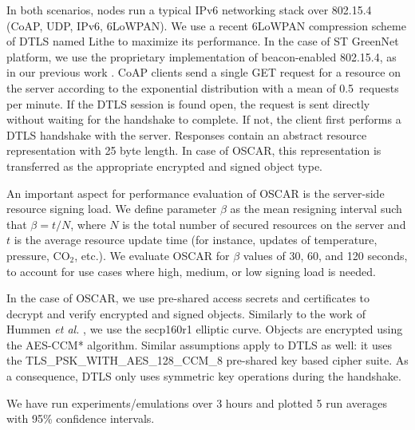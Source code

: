 \documentclass[conference]{IEEEtran}
\begin{document}
In both scenarios, nodes run a typical IPv6 networking stack over 802.15.4
(CoAP, UDP, IPv6, 6LoWPAN). We use a recent 6LoWPAN compression scheme of DTLS
named Lithe \cite{lithe} to maximize its performance. In the case of ST GreenNet platform,
we use the proprietary implementation of beacon-enabled 802.15.4, as in our previous work
 \cite{l2energycost, rpl-topologyconstruction}. CoAP clients send a single
GET request for a resource on the server according to the exponential
distribution with a mean of 0.5~requests per minute. If the DTLS session is
found open, the request is sent directly without waiting for the handshake to
complete. If not, the client first performs a DTLS handshake with the server. Responses contain an abstract resource representation with 25 byte length. In case of OSCAR, this representation is transferred as the appropriate encrypted and signed object type.



An important aspect for performance evaluation of OSCAR is the server-side
resource signing load. We define parameter $\beta$ as the mean resigning
interval such that $\beta=t/N$, where $N$ is the total number of secured
resources on the server and $t$ is the average resource update time (for
instance, updates of temperature, pressure, CO$_2$, etc.). We evaluate OSCAR for
$\beta$ values of 30, 60, and 120 seconds, to account for use cases where high, medium, or low signing load is needed. 

In the case of OSCAR, we use pre-shared access secrets and certificates to
decrypt and verify encrypted and signed objects. Similarly to the work of Hummen
\emph{et al.} \cite{hummen-certificate}, we use the secp160r1 elliptic
curve. Objects are encrypted using the AES-CCM* algorithm. Similar assumptions
apply to DTLS as well: it uses the TLS\_PSK\_WITH\_AES\_128\_CCM\_8 pre-shared key based cipher suite. As a consequence, DTLS only uses symmetric key operations during the handshake.

We have run experiments/emulations over 3 hours and plotted 5 run averages with 95\% confidence intervals.


\begin{table}[htbp]
\caption{Experiment setup.\label{tab:params}
}
\centering
{}
\label{tab:config}
\end{table}
\end{document}
